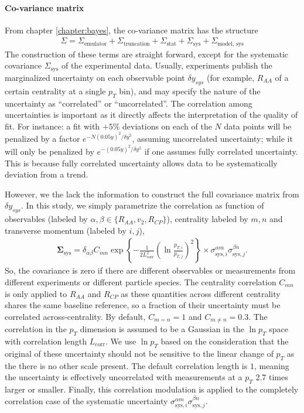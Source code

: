 \paragraph{Co-variance matrix} 
From chapter \ref{chapter:bayes}, the co-variance matrix has the structure
\begin{eqnarray}
\Sigma = \Sigma_{\textrm{emulator}} + \Sigma_{\textrm{truncation}} + \Sigma_{\textrm{stat}} + \Sigma_{\textrm{sys}} + \Sigma_{\textrm{model, sys}} 
\end{eqnarray}
The construction of these terms are straight forward, except for the systematic covariance $\Sigma_{\textrm{sys}}$ of the experimental data.
Usually, experiments publish the marginalized uncertainty on each observable point $\delta y_{sys}$ (for example, $R_{AA}$ of a certain centrality at a single $p_T$ bin), and may specify the nature of the uncertainty as ``correlated'' or ``uncorrelated''.
The correlation among uncertainties is important as it directly affects the interpretation of the quality of fit.
For instance: a fit with $+5\%$ deviations on each of the $N$ data points will be penalized by a factor $e^{-N(0.05 y)^2/\delta y^2}$, assuming uncorrelated uncertainty; while it will only be penalized by $e^{-(0.05 y)^2/\delta y^2}$ if one assumes fully correlated uncertainty.
This is because fully correlated uncertainty allows data to be systematically deviation from a trend.

However, we the lack the information to construct the full covariance matrix from $\delta y_{sys}$.
In this study, we simply parametrize the correlation as function of observables (labeled by $\alpha, \beta \in \{R_{AA}, v_2, R_{CP}\}$), centrality labeled by $m,n$ and transverse momentum (labeled by $i,j$),
\begin{eqnarray}
\mathbf{\Sigma}_{\textrm{sys}} = \delta_{\alpha\beta} C_{mn}  \exp\left\{-\frac{1}{2 L_{\textrm{corr}}^2} \left(\ln\frac{p_{T, i}}{p_{T, j}}\right)^2 \right\} \times \sigma^{\alpha m}_{\textrm{sys}, i}\sigma^{\beta n}_{\textrm{sys}, j}.
\end{eqnarray}
So, the covariance is zero if there are different observables or measurements from different experiments or different particle species.
The centrality correlation $C_{mn}$ is only applied to $R_{AA}$ and $R_{CP}$ as these quantities across different centrality shares the same baseline reference, so a fraction of their uncertainty must be correlated across-centrality. 
By default, $C_{m=n}=1$ and $C_{m\neq n}=0.3$.
The correlation in the $p_T$ dimension is assumed to be a Gaussian in the $\ln p_T$ space with correlation length $L_{\textrm{corr}}$.
We use $\ln p_T$ based on the consideration that the original of these uncertainty should not be sensitive to the linear change of $p_T$ as the there is no other scale present.
The default correlation length is $1$, meaning the uncertainty is effectively uncorrelated with measurements at a $p_T$ $2.7$ times larger or smaller.
Finally, this correlation modulation is applied to the completely correlation case of the systematic uncertainty $\sigma^{\alpha m}_{\textrm{sys}, i}\sigma^{\beta n}_{\textrm{sys}, j}$.

